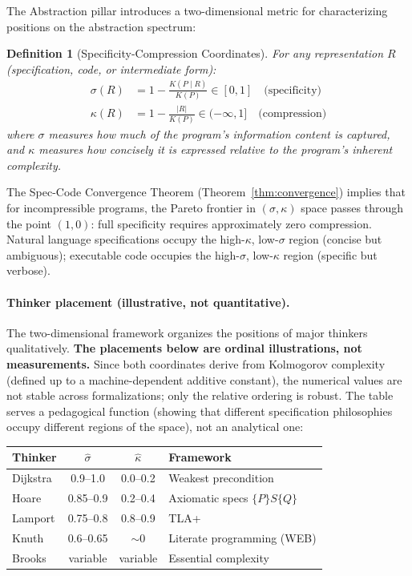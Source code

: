 \documentclass[11pt, a4paper, logo, copyright]{googledeepmind}
\newtheorem{definition}{Definition}[section]
\begin{document}
The Abstraction pillar introduces a two-dimensional metric for characterizing positions on the abstraction spectrum:

\begin{definition}[Specificity-Compression Coordinates]
\label{def:sigma-kappa}
For any representation $R$ (specification, code, or intermediate form):
\begin{align}
    \sigma(R) &= 1 - \frac{K(P \mid R)}{K(P)} \in [0, 1] \quad \text{(specificity)} \\
    \kappa(R) &= 1 - \frac{|R|}{K(P)} \in (-\infty, 1] \quad \text{(compression)}
\end{align}
where $\sigma$ measures how much of the program's information content is captured, and $\kappa$ measures how concisely it is expressed relative to the program's inherent complexity.
\end{definition}

The Spec-Code Convergence Theorem (Theorem~\ref{thm:convergence}) implies that for incompressible programs, the Pareto frontier in $(\sigma, \kappa)$ space passes through the point $(1, 0)$: full specificity requires approximately zero compression. Natural language specifications occupy the high-$\kappa$, low-$\sigma$ region (concise but ambiguous); executable code occupies the high-$\sigma$, low-$\kappa$ region (specific but verbose).

\paragraph{Thinker placement (illustrative, not quantitative).} The two-dimensional framework organizes the positions of major thinkers qualitatively. \textbf{The placements below are ordinal illustrations, not measurements.} Since both coordinates derive from Kolmogorov complexity (defined up to a machine-dependent additive constant), the numerical values are not stable across formalizations; only the relative ordering is robust. The table serves a pedagogical function (showing that different specification philosophies occupy different regions of the space), not an analytical one:

\begin{center}
\small
\begin{tabular}{lccl}
\toprule
\textbf{Thinker} & $\hat{\sigma}$ & $\hat{\kappa}$ & \textbf{Framework} \\
\midrule
Dijkstra & 0.9--1.0 & 0.0--0.2 & Weakest precondition \\
Hoare & 0.85--0.9 & 0.2--0.4 & Axiomatic specs $\{P\}S\{Q\}$ \\
Lamport & 0.75--0.8 & 0.8--0.9 & TLA+ \\
Knuth & 0.6--0.65 & $\sim$0 & Literate programming (WEB) \\
Brooks & variable & variable & Essential complexity \\
\bottomrule
\end{tabular}
\end{center}
\end{document}
